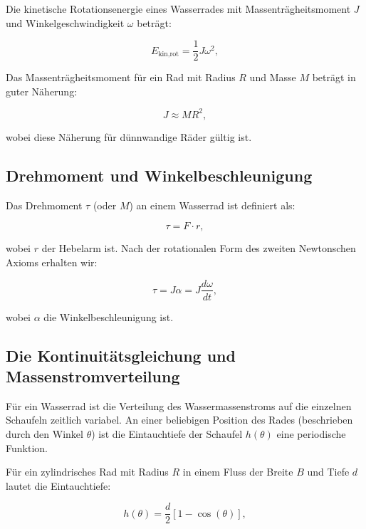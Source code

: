 \documentclass[a4paper,12pt]{article}
\theoremstyle{definition}
\begin{document}
Die kinetische Rotationsenergie eines Wasserrades mit Massenträgheitsmoment $J$ und Winkelgeschwindigkeit $\omega$ beträgt:

\begin{equation}
  E_\text{kin,rot} = \frac{1}{2} J \omega^2,
  \label{eq:ekin_rad}
\end{equation}

Das Massenträgheitsmoment für ein Rad mit Radius $R$ und Masse $M$ beträgt in guter Näherung:

\begin{equation}
  J \approx M R^2,
  \label{eq:j_rad}
\end{equation}

wobei diese Näherung für dünnwandige Räder gültig ist.

\subsection{Drehmoment und Winkelbeschleunigung}

Das Drehmoment $\tau$ (oder $M$) an einem Wasserrad ist definiert als:

\begin{equation}
  \tau = F \cdot r,
  \label{eq:drehmoment}
\end{equation}

\noindent
wobei $r$ der Hebelarm ist. Nach der rotationalen Form des zweiten Newtonschen Axioms erhalten wir:

\begin{equation}
  \tau = J \alpha = J \frac{d\omega}{dt},
  \label{eq:drehmoment_newton}
\end{equation}

\noindent
wobei $\alpha$ die Winkelbeschleunigung ist.

\subsection{Die Kontinuitätsgleichung und Massenstromverteilung}

Für ein Wasserrad ist die Verteilung des Wassermassenstroms auf die einzelnen Schaufeln zeitlich variabel. An einer beliebigen Position des Rades (beschrieben durch den Winkel $\theta$) ist die Eintauchtiefe der Schaufel $h(\theta)$ eine periodische Funktion.

Für ein zylindrisches Rad mit Radius $R$ in einem Fluss der Breite $B$ und Tiefe $d$ lautet die Eintauchtiefe:

\begin{equation}
  h(\theta) = \frac{d}{2}[1 - \cos(\theta)],
  \label{eq:eintauchtiefe}
\end{equation}
\end{document}
